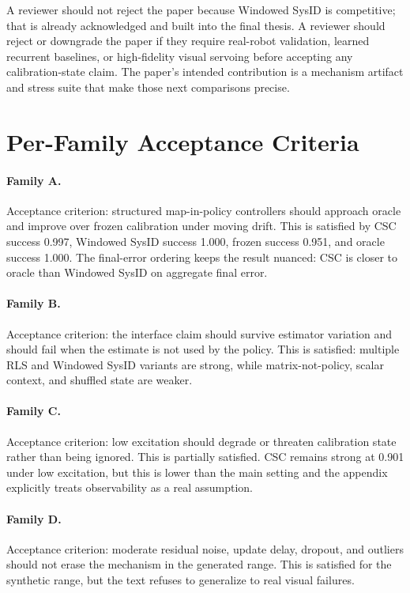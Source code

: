 \documentclass{article}
\begin{document}
A reviewer should not reject the paper because Windowed SysID is competitive;
that is already acknowledged and built into the final thesis. A reviewer should
reject or downgrade the paper if they require real-robot validation, learned
recurrent baselines, or high-fidelity visual servoing before accepting any
calibration-state claim. The paper's intended contribution is a mechanism
artifact and stress suite that make those next comparisons precise.

\section{Per-Family Acceptance Criteria}

\paragraph{Family A.}
Acceptance criterion: structured map-in-policy controllers should approach
oracle and improve over frozen calibration under moving drift. This is
satisfied by CSC success 0.997, Windowed SysID success 1.000, frozen success
0.951, and oracle success 1.000. The final-error ordering keeps the result
nuanced: CSC is closer to oracle than Windowed SysID on aggregate final error.

\paragraph{Family B.}
Acceptance criterion: the interface claim should survive estimator variation
and should fail when the estimate is not used by the policy. This is satisfied:
multiple RLS and Windowed SysID variants are strong, while matrix-not-policy,
scalar context, and shuffled state are weaker.

\paragraph{Family C.}
Acceptance criterion: low excitation should degrade or threaten calibration
state rather than being ignored. This is partially satisfied. CSC remains
strong at 0.901 under low excitation, but this is lower than the main setting
and the appendix explicitly treats observability as a real assumption.

\paragraph{Family D.}
Acceptance criterion: moderate residual noise, update delay, dropout, and
outliers should not erase the mechanism in the generated range. This is
satisfied for the synthetic range, but the text refuses to generalize to real
visual failures.
\end{document}
